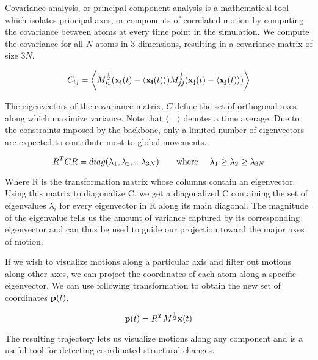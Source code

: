 Covariance analysis, or principal component analysis is a mathematical tool which isolates principal axes, or components of correlated motion by computing the covariance between atoms at every time point in the simulation. We compute the covariance for all $N$ atoms in $3$ dimensions, resulting in a covariance matrix of size $3N$.

\begin{equation}
C_{ij} = \bigg\langle M_{ii}^{\frac{1}{2}} (\mathbf{x_i}(t) - \langle \mathbf{x_i}(t) \rangle) M_{jj}^{\frac{1}{2}} (\mathbf{x_j}(t) - \langle \mathbf{x_j}(t) \rangle) \bigg\rangle
\end{equation}

The eigenvectors of the covariance matrix, $C$ define the set of orthogonal axes along which maximize variance. Note that $\langle \quad \rangle$ denotes a time average. Due to the constraints imposed by the backbone, only a limited number of eigenvectors are expected to contribute most to global movements.

\begin{equation}
R^{T}CR = diag(\lambda_1, \lambda_2, ... \lambda_{3N}) \text{\qquad where \quad} \lambda_1 \geq \lambda_2 \geq \lambda_{3N}
\end{equation}

Where R is the transformation matrix whose columns contain an eigenvector. Using this matrix to diagonalize C, we get a diagonalized C containing the set of eigenvalues $\lambda_i$ for every eigenvector in R along its main diagonal. The magnitude of the eigenvalue tells us the amount of variance captured by its corresponding eigenvector and can thus be used to guide our projection toward the major axes of motion.

If we wish to visualize motions along a particular axis and filter out motions along other axes, we can project the coordinates of each atom along a specific eigenvector. We can use following transformation to obtain the new set of coordinates $\mathbf{p}(t)$.

\begin{equation}
\mathbf{p}(t) = R^{T}M^{\frac{1}{2}}\mathbf{x}(t)
\end{equation}

The resulting trajectory lets us visualize motions along any component and is a useful tool for detecting coordinated structural changes. 

